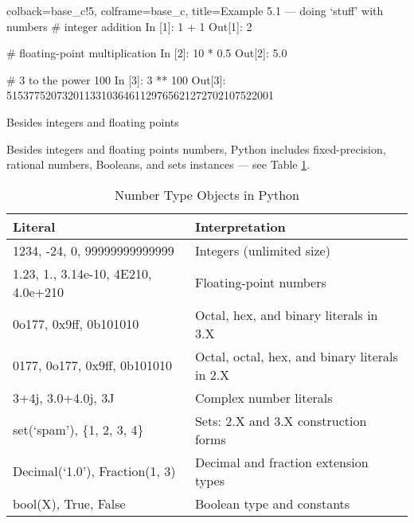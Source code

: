 \documentclass[a4paper,11pt]{book}
\newcommand{\question}[1]{%
    \begin{tcolorbox}[colback=comp_c!10,colframe=comp_c,sidebyside align=top,width=\linewidth,before skip=1ex]
        #1
    \end{tcolorbox}%
    \switchcolumn%
}
\newcommand{\note}[1]{%
    \begin{tcolorbox}[colback=white!0,colframe=white!10,width=\linewidth,before skip=1ex]
        #1
    \end{tcolorbox}         
}
\begin{document}
\begin{pythoncode}[linenos=true,]{colback=base_c!5, colframe=base_c, title=\sffamily Example 5.1 --- doing `stuff' with numbers}
# integer addition
In [1]: 1 + 1
Out[1]: 2
	
# floating-point multiplication
In [2]: 10 * 0.5
Out[2]: 5.0
	
# 3 to the power 100
In [3]: 3 ** 100
Out[3]: 515377520732011331036461129765621272702107522001
	
\end{pythoncode}

\begin{paracol}{2}
	\question{\raggedright Besides integers and floating points}
    \note{Besides integers and floating points numbers, Python includes fixed-precision, rational numbers, Booleans, and sets instances --- see Table \ref{tab:number_types_in_python}.}
\end{paracol}

\begin{table}[!htbp]
	\centering
	\caption{Number Type Objects in Python}
	\label{tab:number_types_in_python}
	\begin{tabular}{ll}
		\toprule \toprule
		Literal & Interpretation\\
		\midrule
		 1234, -24, 0, 99999999999999 & Integers (unlimited size)\\
		 1.23, 1., 3.14e-10, 4E210, 4.0e+210 & Floating-point numbers \\
		 0o177, 0x9ff, 0b101010 & Octal, hex, and binary literals in 3.X \\
		 0177, 0o177, 0x9ff, 0b101010 & Octal, octal, hex, and binary literals in 2.X \\
		 3+4j, 3.0+4.0j, 3J & Complex number literals \\
		 set(`spam'), \{1, 2, 3, 4\} & Sets: 2.X and 3.X construction forms\\ Decimal(`1.0'), Fraction(1, 3) & Decimal and fraction extension types\\ 
		 bool(X), True, False & Boolean type and constants\\
		 \bottomrule
	\end{tabular}
\end{table}
\end{document}
